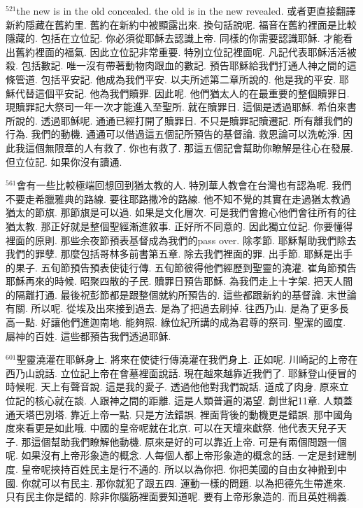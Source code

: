 \documentclass{book}
\begin{document}
$^{521}$the new is in the old concealed.
the old is in the new revealed.
或者更直接翻譯新約隱藏在舊約里.
舊約在新約中被顯露出來.
換句話說呢.
福音在舊約裡面是比較隱藏的.
包括在立位記.
你必須從耶穌去認識上帝.
同樣的你需要認識耶穌.
才能看出舊約裡面的福氣.
因此立位記非常重要.
特別立位記裡面呢.
凡記代表耶穌活活被殺.
包括數記.
唯一沒有帶著動物肉跟血的數記.
預告耶穌給我們打通人神之間的這條管道.
包括平安記.
他成為我們平安.
以夫所述第二章所說的.
他是我的平安.
耶穌代替這個平安記.
他為我們贖罪.
因此呢.
他們猶太人的在最重要的整個贖罪日.
現贖罪記大祭司一年一次才能進入至聖所.
就在贖罪日.
這個是透過耶穌.
希伯來書所說的.
透過耶穌呢.
通通已經打開了贖罪日.
不只是贖罪記贖遷記.
所有離我們的行為.
我們的動機.
通通可以借過這五個記所預告的基督論.
救恩論可以洗乾淨.
因此我這個無限章的人有救了.
你也有救了.
那這五個記會幫助你瞭解是往心在發展.
但立位記.
如果你沒有讀通.

$^{561}$會有一些比較極端回想回到猶太教的人.
特別華人教會在台灣也有認為呢.
我們不要走希臘雅典的路線.
要往耶路撒冷的路線.
他不知不覺的其實在走過猶太教過猶太的節旗.
那節旗是可以過.
如果是文化層次.
可是我們會擔心他們會往所有的往猶太教.
那正好就是整個聖經漸進敘事.
正好所不同意的.
因此獨立位記.
你要懂得裡面的原則.
那些余夜節預表基督成為我們的pass over.
除孝節.
耶穌幫助我們除去我們的罪孽.
那麼包括哥林多前書第五章.
除去我們裡面的罪.
出手節.
耶穌是出手的果子.
五旬節預告預表使徒行傳.
五旬節彼得他們經歷到聖靈的澆灌.
崔角節預告耶穌再來的時候.
昭聚四散的子民.
贖罪日預告耶穌.
為我們走上十字架.
把天人間的隔離打通.
最後祝彭節都是跟整個就約所預告的.
這些都跟新約的基督論.
末世論有關.
所以呢.
從埃及出來接到過去.
是為了把過去刷掉.
往西乃山.
是為了更多長高一點.
好讓他們進迦南地.
能夠照.
綠位紀所講的成為君尊的祭司.
聖潔的國度.
屬神的百姓.
這些都預告我們透過耶穌.

$^{601}$聖靈澆灌在耶穌身上.
將來在使徒行傳澆灌在我們身上.
正如呢.
川崎記的上帝在西乃山說話.
立位記上帝在會墓裡面說話.
現在越來越靠近我們了.
耶穌登山便冒的時候呢.
天上有聲音說.
這是我的愛子.
透過他他對我們說話.
道成了肉身.
原來立位記的核心就在談.
人跟神之間的距離.
這是人類普遍的渴望.
創世紀11章.
人類蓋通天塔巴別塔.
靠近上帝一點.
只是方法錯誤.
裡面背後的動機更是錯誤.
那中國角度來看更是如此哦.
中國的皇帝呢就在北京.
可以在天壇來獻祭.
他代表天兒子天子.
那這個幫助我們瞭解他動機.
原來是好的可以靠近上帝.
可是有兩個問題一個呢.
如果沒有上帝形象造的概念.
人每個人都上帝形象造的概念的話.
一定是封建制度.
皇帝呢挾持百姓民主是行不通的.
所以以為你把.
你把美國的自由女神搬到中國.
你就可以有民主.
那你就犯了跟五四.
運動一樣的問題.
以為把德先生帶進來.
只有民主你是錯的.
除非你腦筋裡面要知道呢.
要有上帝形象造的.
而且英姓稱義.
\end{document}
